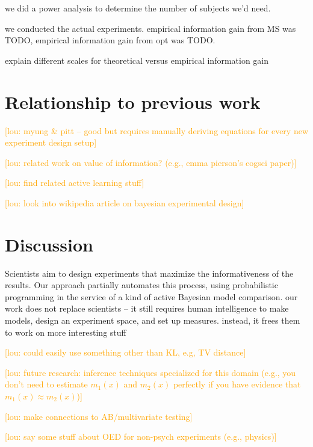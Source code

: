 \documentclass{article}
\newcommand{\lou}[1]{\textcolor{orange}{[lou: #1]}}
\newcommand{\cas}[1]{ \textsf{\color{darkgray} \scriptsize #1} }
\begin{document}
\cas{we did a power analysis to determine the number of subjects we'd need.}

\cas{we conducted the actual experiments. empirical information gain from MS was TODO, empirical information gain from opt was TODO.}

\cas{explain different scales for theoretical versus empirical information gain}

\section{Relationship to previous work}

\lou{myung \& pitt -- good but requires manually deriving equations for every new experiment design setup}

\lou{related work on value of information? (e.g., emma pierson's cogsci paper)}

\lou{find related active learning stuff}

\lou{look into wikipedia article on bayesian experimental design}

\section{Discussion}

Scientists aim to design experiments that maximize the informativeness of the results.
Our approach partially automates this process, using probabilistic programming in the service of a kind of active Bayesian model comparison.
\cas{our work does not replace scientists -- it still requires human intelligence to make models, design an experiment space, and set up measures. instead, it frees them to work on more interesting stuff}

\lou{could easily use something other than KL, e.g, TV distance}

\lou{future research: inference techniques specialized for this domain (e.g., you don't need to estimate $m_1(x)$ and $m_2(x)$ perfectly if you have evidence that $m_1(x) \approx m_2(x)$)}

\lou{make connections to AB/multivariate testing}

\lou{say some stuff about OED for non-psych experiments (e.g., physics)}



\end{document}
